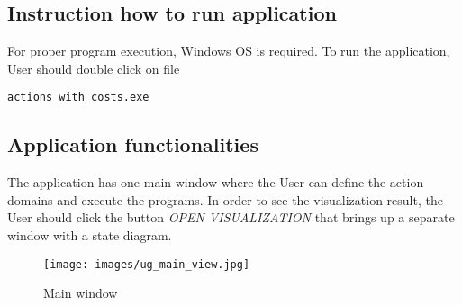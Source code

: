 \documentclass[a4paper]{article}
\begin{document}
\subsection{Instruction how to run application}
%
For proper program execution, Windows OS is required. To run the application, User should double click on file \begin{verbatim}actions_with_costs.exe\end{verbatim}
%
\subsection{Application functionalities}
The application has one main window where the User can define the action domains and execute the programs. In order to see the visualization result, the User should click the button \textit{OPEN VISUALIZATION} that brings up a separate window with a state diagram.

\begin{figure}[htp]
    \centering
    \texttt{[image: images/ug\_main\_view.jpg]}
    \caption{Main window}
    \label{fig:cm-rho-001}
\end{figure}
\end{document}
